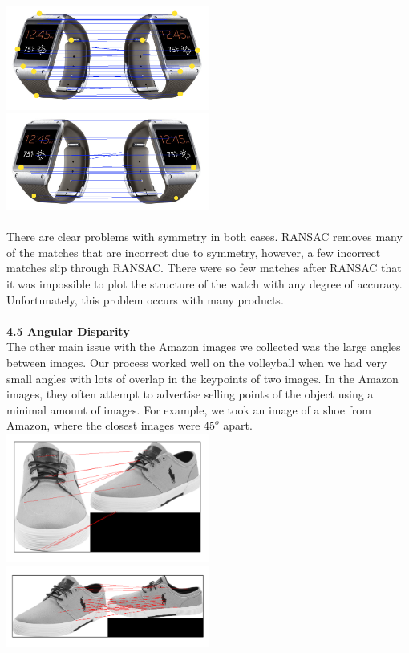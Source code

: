 \documentclass[12pt]{article}
\begin{document}
\begin{multicols}{2}
\includegraphics[width=0.5\textwidth]{images/watch_symmetry_before_ransac.png}
\includegraphics[width=0.5\textwidth]{images/watch_symmetry.png} \\\\
There are clear problems with symmetry in both cases. RANSAC removes many of the matches that are incorrect due to symmetry, however, a few incorrect matches slip through RANSAC. There were so few matches after RANSAC that it was impossible to plot the structure of the watch with any degree of accuracy. Unfortunately, this problem occurs with many products.\\\\
{\large \textbf{4.5 Angular Disparity}}\\
The other main issue with the Amazon images we collected was the large angles between images. Our process worked well on the volleyball when we had very small angles with lots of overlap in the keypoints of two images. In the Amazon images, they often attempt to advertise selling points of the object using a minimal amount of images. For example, we took an image of a shoe from Amazon, where the closest images were $45^o$ apart.\\
\includegraphics[width=0.5\textwidth]{images/ShoeFrontAngle.png} 
\includegraphics[width=0.5\textwidth]{images/ShoeAngleLeft.png} 

\end{multicols}
\end{document}
